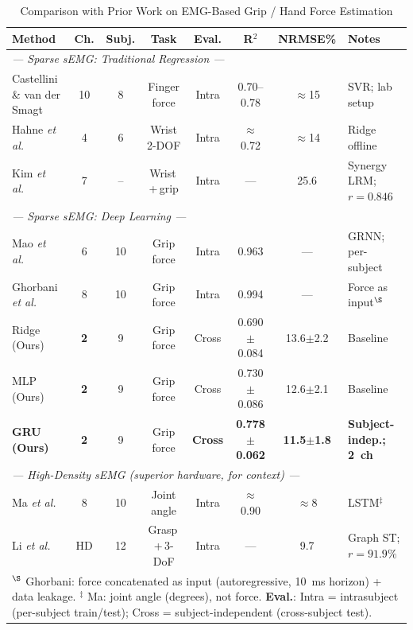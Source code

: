 \documentclass[journal]{IEEEtran}
\begin{document}
\begin{table}[!ht]
\centering
\caption{Comparison with Prior Work on EMG-Based Grip / Hand Force Estimation}
\label{tab:prior_work}
\setlength{\tabcolsep}{3pt}
\begin{tabular}{p{3.6cm}ccccccp{2.8cm}}
\toprule
\textbf{Method} & \textbf{Ch.} & \textbf{Subj.} & \textbf{Task} & \textbf{Eval.} & \textbf{R$^2$} & \textbf{NRMSE\%} & \textbf{Notes} \\
\midrule
\multicolumn{8}{l}{\textit{--- Sparse sEMG: Traditional Regression ---}} \\[1pt]
Castellini \& van der Smagt~\cite{castellini2009surface}
  & 10 & 8  & Finger force     & Intra  & 0.70--0.78 & $\approx$15 & SVR; lab setup \\
Hahne \emph{et al.}~\cite{hahne2014linear}
  & 4  & 6  & Wrist 2-DOF      & Intra  & $\approx$0.72 & $\approx$14 & Ridge offline \\
Kim \emph{et al.}~\cite{kim2020muscle}
  & 7  & -- & Wrist\,+\,grip   & Intra  & ---  & 25.6 & Synergy LRM; $r{=}0.846$ \\
\midrule
\multicolumn{8}{l}{\textit{--- Sparse sEMG: Deep Learning ---}} \\[1pt]
Mao \emph{et al.}~\cite{mao2023continuous}
  & 6  & 10 & Grip force       & Intra  & 0.963  & ---         & GRNN; per-subject \\
Ghorbani \emph{et al.}~\cite{ghorbani2023estimation}
  & 8  & 10 & Grip force       & Intra  & 0.994  & ---         & Force as input$^\S$ \\
Ridge (Ours)  & \textbf{2} & 9 & Grip force & Cross & 0.690$\pm$0.084 & 13.6$\pm$2.2 & Baseline \\
MLP (Ours)    & \textbf{2} & 9 & Grip force & Cross & 0.730$\pm$0.086 & 12.6$\pm$2.1 & Baseline \\
\textbf{GRU (Ours)} & \textbf{2} & 9 & Grip force & \textbf{Cross} & \textbf{0.778$\pm$0.062} & \textbf{11.5$\pm$1.8} & \textbf{Subject-indep.; 2~ch} \\
\midrule
\multicolumn{8}{l}{\textit{--- High-Density sEMG (superior hardware, for context) ---}} \\[1pt]
Ma \emph{et al.}~\cite{ma2021continuous}
  & 8  & 10 & Joint angle & Intra & $\approx$0.90 & $\approx$8 & LSTM$^\ddag$ \\
Li \emph{et al.}~\cite{li2024graph}
  & HD & 12 & Grasp\,+\,3-DoF  & Intra & --- & 9.7  & Graph ST; $r{=}91.9\%$ \\
\midrule
\multicolumn{8}{p{17.5cm}}{\small
  $^\S$ Ghorbani: force concatenated as input (autoregressive, 10~ms horizon) + data leakage.
  $^\ddag$ Ma: joint angle (degrees), not force.
  \textbf{Eval.}: Intra = intrasubject (per-subject train/test);
  Cross = subject-independent (cross-subject test).} \\
\bottomrule
\end{tabular}
\end{table}
\end{document}
